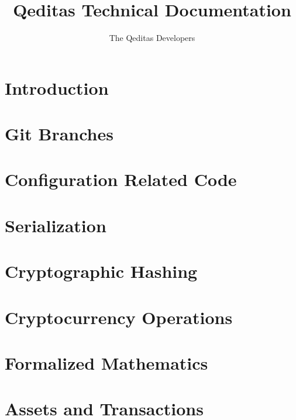 \documentclass{book}
\title{Qeditas Technical Documentation}
\author{The Qeditas Developers}
\begin{document}
\maketitle

\chapter{Introduction}



\chapter{Git Branches}\label{chap:branches}



\chapter{Configuration Related Code}\label{chap:config}



\chapter{Serialization}\label{chap:ser}



\chapter{Cryptographic Hashing}\label{chap:hash}



\chapter{Cryptocurrency Operations}\label{chap:cryptocurr}



\chapter{Formalized Mathematics}\label{chap:math}



\chapter{Assets and Transactions}\label{chap:assetstx}


\end{document}
